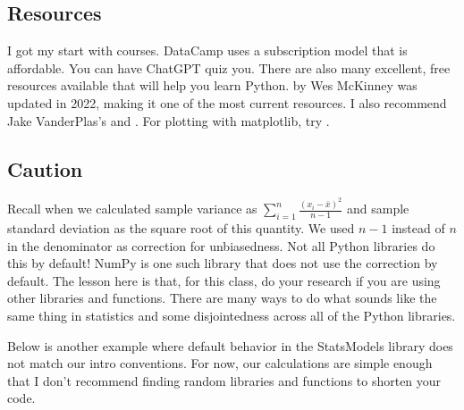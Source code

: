 \documentclass{article}
\begin{document}
\subsection{Resources}

I got my start with  courses. DataCamp uses a subscription model that is affordable. You can have ChatGPT quiz you. There are also many excellent, free resources available that will help you learn Python.  by Wes McKinney was updated in 2022, making it one of the most current resources. I also recommend Jake VanderPlas's  and . For plotting with matplotlib, try . 

\subsection{Caution}

Recall when we calculated sample variance as $\sum_{i=1}^n \frac{(x_i - \bar{x})^2}{n-1}$ and sample standard deviation as the square root of this quantity. We used $n-1$ instead of $n$ in the denominator as correction for unbiasedness. Not all Python libraries do this by default! NumPy is one such library that does not use the correction by default. The lesson here is that, for this class, do your research if you are using other libraries and functions. There are many ways to do what sounds like the same thing in statistics and some disjointedness across all of the Python libraries. 

Below is another example where default behavior in the StatsModels library does not match our intro conventions. For now, our calculations are simple enough that I don't recommend finding random libraries and functions to shorten your code. 

\end{document}
